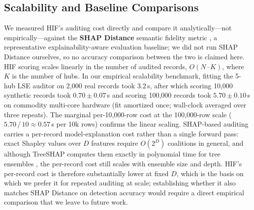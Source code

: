\subsection{Scalability and Baseline Comparisons}\label{app:scalability}
We measured HIF's auditing cost directly and compare it analytically---not empirically---against the \textbf{SHAP Distance} semantic fidelity metric \cite{yu2025shap}, a representative explainability-aware evaluation baseline; we did not run SHAP Distance ourselves, so no accuracy comparison between the two is claimed here. HIF scoring scales linearly in the number of audited records, $O(N \cdot K)$, where $K$ is the number of hubs. In our empirical scalability benchmark, fitting the 5-hub LSE auditor on 2,000 real records took $3.2$\,s, after which scoring 10,000 synthetic records took $0.70 \pm 0.07$\,s and scoring 100,000 records took $5.70 \pm 0.10$\,s on commodity multi-core hardware (fit amortized once; wall-clock averaged over three repeats). The marginal per-10,000-row cost at the 100,000-row scale ($5.70\,/\,10 \approx 0.57$\,s per 10k rows) confirms the linear scaling. SHAP-based auditing carries a per-record model-explanation cost rather than a single forward pass: exact Shapley values over $D$ features require $O(2^D)$ coalitions in general, and although TreeSHAP computes them exactly in polynomial time for tree ensembles \cite{lundberg2020local}, the per-record cost still scales with ensemble size and depth. HIF's per-record cost is therefore substantially lower at fixed $D$, which is the basis on which we prefer it for repeated auditing at scale; establishing whether it also matches SHAP Distance on detection accuracy would require a direct empirical comparison that we leave to future work.

